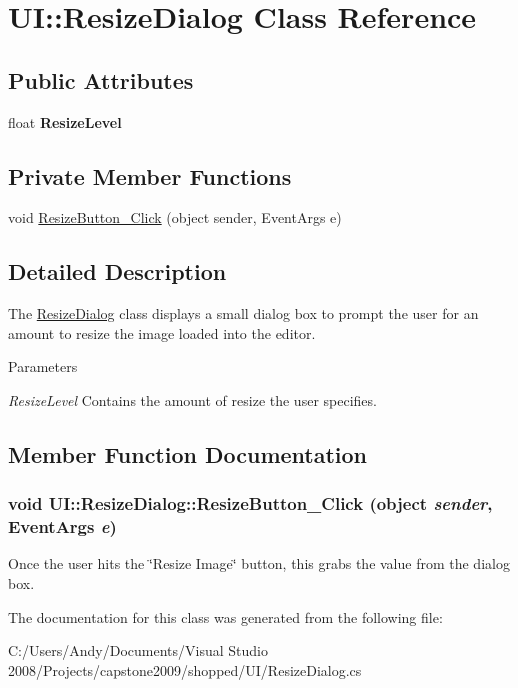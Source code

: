 \hypertarget{class_u_i_1_1_resize_dialog}{
\section{UI::ResizeDialog Class Reference}
\label{class_u_i_1_1_resize_dialog}
}
\subsection*{Public Attributes}
\begin{DoxyCompactItemize}
\item 
\hypertarget{class_u_i_1_1_resize_dialog_af8b6b6d17d8ca70b6721793ca833f7e9}{
float {\bfseries ResizeLevel}}
\label{class_u_i_1_1_resize_dialog_af8b6b6d17d8ca70b6721793ca833f7e9}

\end{DoxyCompactItemize}
\subsection*{Private Member Functions}
\begin{DoxyCompactItemize}
\item 
void \hyperlink{class_u_i_1_1_resize_dialog_a8bd7462ff2288c8e77d91e3197729ccc}{ResizeButton\_\-Click} (object sender, EventArgs e)
\end{DoxyCompactItemize}


\subsection{Detailed Description}
The \hyperlink{class_u_i_1_1_resize_dialog}{ResizeDialog} class displays a small dialog box to prompt the user for an amount to resize the image loaded into the editor.


\begin{DoxyParams}{Parameters}
\item[{\em ResizeLevel}]Contains the amount of resize the user specifies. \end{DoxyParams}


\subsection{Member Function Documentation}
\hypertarget{class_u_i_1_1_resize_dialog_a8bd7462ff2288c8e77d91e3197729ccc}{
\subsubsection[{ResizeButton\_\-Click}]{\setlength{\rightskip}{0pt plus 5cm}void UI::ResizeDialog::ResizeButton\_\-Click (object {\em sender}, \/  EventArgs {\em e})}}
\label{class_u_i_1_1_resize_dialog_a8bd7462ff2288c8e77d91e3197729ccc}
Once the user hits the \char`\"{}Resize Image\char`\"{} button, this grabs the value from the dialog box. 

The documentation for this class was generated from the following file:\begin{DoxyCompactItemize}
\item 
C:/Users/Andy/Documents/Visual Studio 2008/Projects/capstone2009/shopped/UI/ResizeDialog.cs\end{DoxyCompactItemize}
